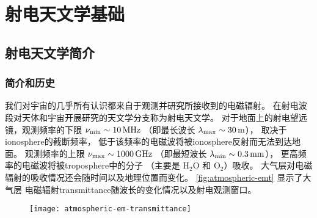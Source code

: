 

\chapter{射电天文学基础}
\label{chap:radio-astronomy}

\section{射电天文学简介}
\label{sec:radio-astro-intro}

\subsection{简介和历史}

我们对宇宙的几乎所有认识都来自于观测并研究所接收到的电磁辐射。
在射电波段对天体和宇宙开展研究的天文学分支称为射电天文学。
对于地面上的射电望远镜，观测频率的下限 $\nu_{\R{min}} \sim \SI{10}{\MHz}$
（即最长波长 $\lambda_{\mathrm{max}} \sim \SI{30}{\meter}$），
取决于\ac{ionosphere}的截断频率，
低于该频率的电磁波将被\ac{ionosphere}反射而无法到达地面。
观测频率的上限 $\nu_{\R{max}} \sim \SI{1000}{\GHz}$
（即最短波长 $\lambda_{\R{min}} \sim \SI{0.3}{\mm}$），
更高频率的电磁波将被\ac{troposphere}中的分子
（主要是 $\mathrm{H_2 O}$ 和 $\mathrm{O_2}$）吸收。
大气层对电磁辐射的吸收情况还会随时间以及地理位置而变化。
\autoref{fig:atmospheric-emt} 显示了大气层
电磁辐射\ac{transmittance}随波长的变化情况以及射电观测窗口。

\begin{figure}[htp]
  \centering
  \texttt{[image: atmospheric-em-transmittance]}
  \label{fig:atmospheric-emt}
\end{figure}

